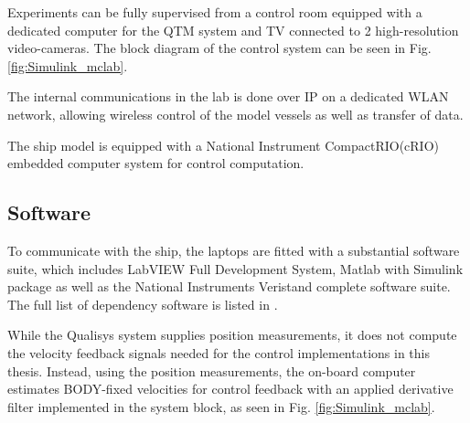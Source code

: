Experiments can be fully supervised from a control room equipped with a dedicated computer for the QTM system and TV connected to 2 high-resolution video-cameras. The block diagram of the control system can be seen in Fig. \ref{fig:Simulink_mclab}.

The internal communications in the lab is done over IP on a dedicated WLAN network, allowing wireless control of the model vessels as well as transfer of data.

The ship model is equipped with a National Instrument CompactRIO(cRIO) embedded computer system for control computation.

\subsection{Software}

To communicate with the ship, the laptops are fitted with a substantial software suite, which includes LabVIEW Full Development System, Matlab with Simulink package as well as the National Instruments Veristand complete software suite. The full list of dependency software is listed in \cite{}.

While the Qualisys system supplies position measurements, it does not compute the velocity feedback signals needed for the control implementations in this thesis. Instead, using the position measurements, the on-board computer estimates BODY-fixed velocities for control feedback with an applied derivative filter implemented in the system block, as seen in Fig. \ref{fig:Simulink_mclab}. 


